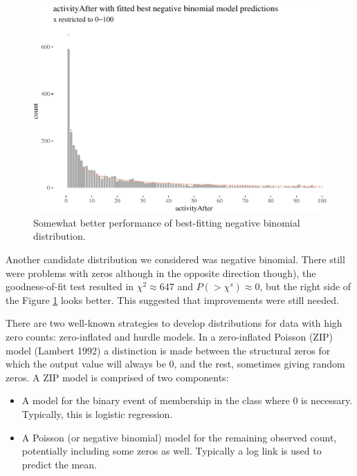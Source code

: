 \documentclass[10pt,]{scrartcl}
\begin{document}
\begin{figure}

\begin{center}\includegraphics[width=1\linewidth]{redditAnalysisWalkthrough_files/figure-latex/unnamed-chunk-75-1} \end{center}
\caption{Somewhat better performance of best-fitting negative binomial distribution.}
\label{fig:nbinperf}
\end{figure}

Another candidate distribution we considered was negative binomial.
There still were problems with zeros although in the opposite direction
though), the goodness-of-fit test resulted in \(\chi^2 \approx 647\) and
\(P(>\chi^s)\approx 0\), but the right side of the Figure
\ref{fig:nbinperf} looks better. This suggested that improvements were
still needed.

There are two well-known strategies to develop distributions for data
with high zero counts: zero-inflated and hurdle models. In a
zero-inflated Poisson (ZIP) model (Lambert 1992) a distinction is made
between the structural zeros for which the output value will always be
0, and the rest, sometimes giving random zeros. A ZIP model is comprised
of two components:

\begin{itemize}
\item  A model for the binary event of membership in the class where 0 is necessary. Typically, this is logistic regression. 

\item  A Poisson (or negative binomial) model for the remaining observed count, potentially including some zeros as well. Typically a log link is used to predict the mean.
\end{itemize}
\end{document}
